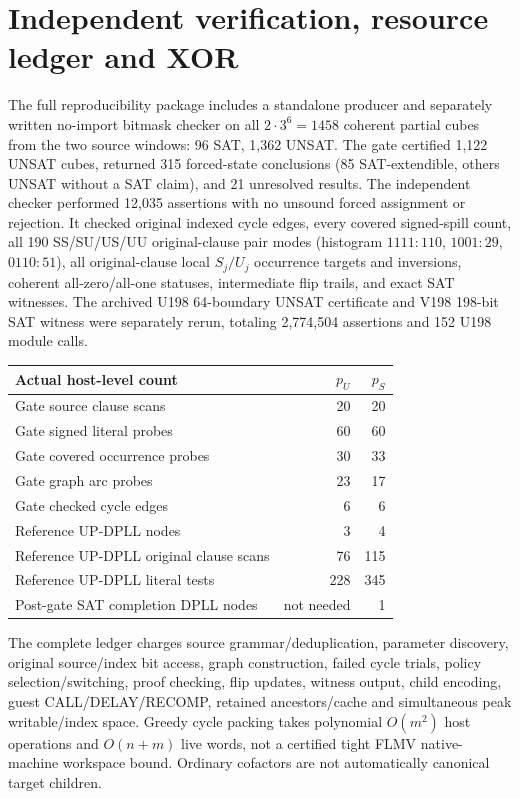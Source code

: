 \documentclass[11pt]{article}
\begin{document}
\section{Independent verification, resource ledger and XOR}
The full reproducibility package includes a standalone producer and separately written no-import bitmask checker on all $2\cdot3^6=1458$ coherent partial cubes from the two source windows: 96 SAT, 1,362 UNSAT. The gate certified 1,122 UNSAT cubes, returned 315 forced-state conclusions (85 SAT-extendible, others UNSAT without a SAT claim), and 21 unresolved results. The independent checker performed 12,035 assertions with no unsound forced assignment or rejection. It checked original indexed cycle edges, every covered signed-spill count, all 190 SS/SU/US/UU original-clause pair modes (histogram $1111:110$, $1001:29$, $0110:51$), all original-clause local $S_j/U_j$ occurrence targets and inversions, coherent all-zero/all-one statuses, intermediate flip trails, and exact SAT witnesses. The archived U198 64-boundary UNSAT certificate and V198 198-bit SAT witness were separately rerun, totaling 2,774,504 assertions and 152 U198 module calls.
\begin{center}\begin{tabular}{lrr}\toprule
Actual host-level count&$p_U$&$p_S$\\\midrule
Gate source clause scans&20&20\\
Gate signed literal probes&60&60\\
Gate covered occurrence probes&30&33\\
Gate graph arc probes&23&17\\
Gate checked cycle edges&6&6\\
Reference UP-DPLL nodes&3&4\\
Reference UP-DPLL original clause scans&76&115\\
Reference UP-DPLL literal tests&228&345\\
Post-gate SAT completion DPLL nodes&not needed&1\\\bottomrule\end{tabular}\end{center}
The complete ledger charges source grammar/deduplication, parameter discovery, original source/index bit access, graph construction, failed cycle trials, policy selection/switching, proof checking, flip updates, witness output, child encoding, guest CALL/DELAY/RECOMP, retained ancestors/cache and simultaneous peak writable/index space. Greedy cycle packing takes polynomial $O(m^2)$ host operations and $O(n+m)$ live words, not a certified tight FLMV native-machine workspace bound. Ordinary cofactors are not automatically canonical target children.
\end{document}
